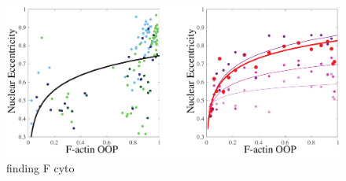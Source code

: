 \begin{figure}[h]
\centering
\captionsetup{width=.9\linewidth}
\includegraphics[width=4.5in]{Project3/figs/EccentricityvsOOP.pdf}
\caption{finding F cyto}
\label{fig::eccopp}
\end{figure}



